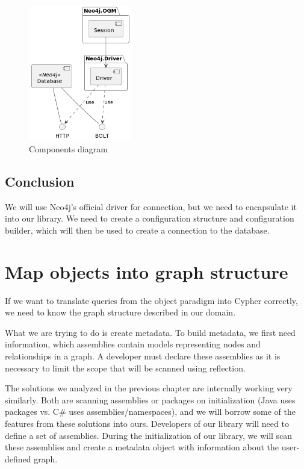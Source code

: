 \begin{figure}[H]
    \centering
    \includegraphics[width=0.4\textwidth]{content/components.png}
    \caption{Components diagram}
\end{figure}

\subsection{Conclusion}

We will use Neo4j's official driver for connection, but we need to encapsulate it into our library.
We need to create a configuration structure and configuration builder, which will then be used to create a connection to the database.

\section {Map objects into graph structure}

If we want to translate queries from the object paradigm into Cypher correctly, we need to know the graph structure described in our domain.

What we are trying to do is create metadata. To build metadata, we first need information, which assemblies contain models representing nodes and relationships in a graph. A developer must declare these assemblies as it is necessary to limit the scope that will be scanned using reflection.

The solutions we analyzed in the previous chapter are internally working very similarly. Both are scanning assemblies or packages on initialization (Java uses packages vs. C\# uses assemblies/namespaces), and we will borrow some of the features from these solutions into ours.
Developers of our library will need to define a set of assemblies. During the initialization of our library, we will scan these assemblies and create a metadata object with information about the user-defined graph.

